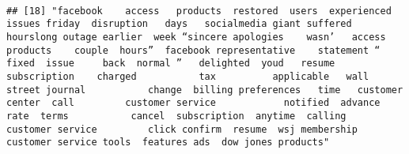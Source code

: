 \documentclass[
]{article}
\begin{document}
\begin{verbatim}
                                                                                                                                                                                                                                                                                                                                                                                                                                                                   
## [18] "facebook    access   products  restored  users  experienced issues friday  disruption   days   socialmedia giant suffered  hourslong outage earlier  week “sincere apologies    wasn’   access  products    couple  hours”  facebook representative    statement “ fixed  issue     back  normal ”   delighted  youd   resume  subscription    charged           tax          applicable   wall street journal           change  billing preferences   time   customer center  call         customer service            notified  advance     rate  terms           cancel  subscription  anytime  calling         customer service         click confirm  resume  wsj membership customer service tools  features ads  dow jones products"                                                                                                                                                                                                                                                                                                                                                                                                                                                                                                                                                                                                                                                                                                                                                                                                                                                                                                                                                                                                                                                                                                                                                                                                                                                                                                                                                                                                                                                                                                                                                                                                                                                                                                                                                                                                                                                                                                                                                                                                                                                                                                                                                                                                                               
\end{verbatim}
\end{document}
